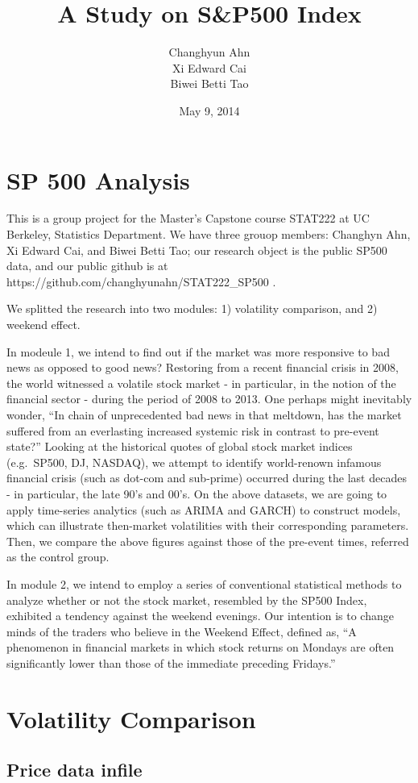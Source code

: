 \documentclass[letterpaper,10pt,english]{/Users/edwsurewin/anaconda/lib/python2.7/site-packages/sphinx/texinputs/sphinxhowto}
\title{A Study on S\&P500 Index}
\date{May 9, 2014}
\author{Changhyun Ahn\\Xi Edward Cai\\Biwei Betti Tao}
\begin{document}
        
            \maketitle
        

        


        
        \section{SP 500 Analysis}\label{sp-500-analysis}

This is a group project for the Master's Capstone course STAT222 at UC
Berkeley, Statistics Department. We have three grouop members: Changhyn
Ahn, Xi Edward Cai, and Biwei Betti Tao; our research object is the
public SP500 data, and our public github is at
https://github.com/changhyunahn/STAT222\_SP500 .

We splitted the research into two modules: 1) volatility comparison, and
2) weekend effect.

In modeule 1, we intend to find out if the market was more responsive to
bad news as opposed to good news? Restoring from a recent financial
crisis in 2008, the world witnessed a volatile stock market - in
particular, in the notion of the financial sector - during the period of
2008 to 2013. One perhaps might inevitably wonder, ``In chain of
unprecedented bad news in that meltdown, has the market suffered from an
everlasting increased systemic risk in contrast to pre-event state?''
Looking at the historical quotes of global stock market indices
(e.g.~SP500, DJ, NASDAQ), we attempt to identify world-renown infamous
financial crisis (such as dot-com and sub-prime) occurred during the
last decades - in particular, the late 90's and 00's. On the above
datasets, we are going to apply time-series analytics (such as ARIMA and
GARCH) to construct models, which can illustrate then-market
volatilities with their corresponding parameters. Then, we compare the
above figures against those of the pre-event times, referred as the
control group.

In module 2, we intend to employ a series of conventional statistical
methods to analyze whether or not the stock market, resembled by the
SP500 Index, exhibited a tendency against the weekend evenings. Our
intention is to change minds of the traders who believe in the Weekend
Effect, defined as, ``A phenomenon in financial markets in which stock
returns on Mondays are often significantly lower than those of the
immediate preceding Fridays.''\section{Volatility Comparison}\label{volatility-comparison}\subsection{Price data infile}\label{price-data-infile}
\end{document}
